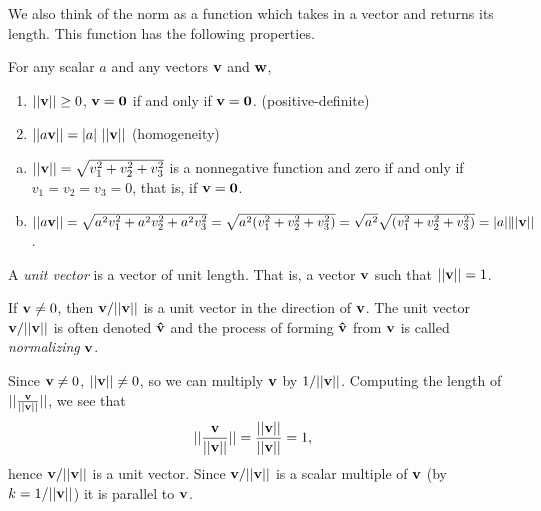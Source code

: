 \documentclass[12pt,letterpaper,reqno]{article}
\numberwithin{equation}{section}
\newcommand{\ti}[1]{\textit{#1}}
\begin{document}
We also think of the norm as a function which takes in a vector and returns its length. This function has the following properties.

\begin{prop}
	For any scalar $a$ and any vectors ${\bf v}$ and ${\bf w}$,
	\begin{enumerate}[(1)]
		\item $||{\bf v}|| \geq 0$, ${\bf v}={\bf 0}$ if and only if ${\bf v}={\bf 0}$. (positive-definite)
		\item $||a{\bf v}||=|a| \ ||{\bf v}||$ (homogeneity)
	\end{enumerate}
\end{prop}

\begin{pf}
\begin{enumerate}[(a)]
	\item $||{\bf v}||=\sqrt{v_1^2+v_2^2+v_3^2}$ is a nonnegative function and zero if and only if $v_1=v_2=v_3=0$, that is, if ${\bf v}={\bf 0}$.
	\item $||a{\bf v}||=\sqrt{a^2v_1^2+a^2v_2^2+a^2v_3^2}=\sqrt{a^2(v_1^2+v_2^2+v_3^2)}=\sqrt{a^2}\sqrt{(v_1^2+v_2^2+v_3^2)}=|a|\||{\bf v}||$.
\end{enumerate}
\end{pf}


\begin{defn}
	A \ti{unit vector} is a vector of unit length. That is, a vector ${\bf v}$ such that $||{\bf v}||=1$.
\end{defn}

\begin{prop}
	If ${\bf v}\neq 0$, then ${\bf v}/||{\bf v}||$ is a unit vector in the direction of ${\bf v}$. The unit vector ${\bf v}/||{\bf v}||$ is often denoted ${\bf \hat{v}}$ and the process of forming ${\bf \hat{v}}$ from ${\bf v}$ is called \ti{normalizing} ${\bf v}$.
\end{prop}

\begin{pf}
Since ${\bf v}\neq 0$, $||{\bf v}|| \neq 0$, so we can multiply ${\bf v}$ by $1/||{\bf v}||$. Computing the length of $||\frac{{\bf v}}{||{\bf v}||}||$, we see that 
\begin{align*}
	||\frac{{\bf v}}{||{\bf v}||}||&=\frac{||{\bf v}||}{||{\bf v}||}=1,
\end{align*} 
hence ${\bf v}/||{\bf v}||$ is a unit vector. Since ${\bf v}/||{\bf v}||$ is a scalar multiple of ${\bf v}$ (by $k=1/||{\bf v}||$) it is parallel to ${\bf v}$.
\end{pf}
\end{document}
